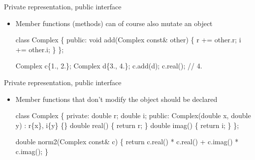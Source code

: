 \begin{frame}[fragile]{Private representation, public interface
    \insertcontinuationtext}

  \begin{itemize}
  \item Member functions (methods) can of course also mutate an object
    \begin{codeblock}
class Complex \{
 public:
  void add(Complex const& other) \{
    r += other.r;
    i += other.i;
  \}
  \ddd
\};

Complex c\{1., 2.\};
Complex d\{3., 4.\};
c.add(d);
c.real(); // 4.

\end{codeblock}

  \end{itemize}

\end{frame}

\begin{frame}[fragile]{Private representation, public interface
    \insertcontinuationtext}

  \begin{itemize}
  \item Member functions that don't modify the object should be declared
    \textbf{}

\begin{codeblock}
class Complex \{
 private:
  double r;
  double i;
 public:
  Complex(double x, double y) : r\{x\}, i\{y\} \{\}
  double real() \{ return r; \}
  double imag() \{ return i; \}
\};

double norm2(Complex \alert{const}& c) \{
  return c.real() * c.real() + c.imag() * c.imag();
\}\end{codeblock}

  \end{itemize}

\end{frame}

